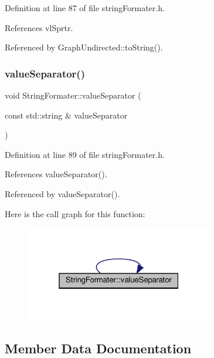 Definition at line 87 of file string\+Formater.\+h.



References vl\+Sprtr.



Referenced by Graph\+Undirected\+::to\+String().

\mbox{\label{classStringFormater_aa39006dd16b8c4f2ef55c6898b4561db}} 
\subsubsection{\texorpdfstring{value\+Separator()}{valueSeparator()}\hspace{0.1cm}{\footnotesize\ttfamily [2/2]}}
{\footnotesize\ttfamily void String\+Formater\+::value\+Separator (\begin{DoxyParamCaption}\item[{const std\+::string \&}]{value\+Separator }\end{DoxyParamCaption})\hspace{0.3cm}{\ttfamily [inline]}}



Definition at line 89 of file string\+Formater.\+h.



References value\+Separator().



Referenced by value\+Separator().

Here is the call graph for this function\+:
\nopagebreak
\begin{figure}[H]
\begin{center}
\leavevmode
\includegraphics[width=232pt]{classStringFormater_aa39006dd16b8c4f2ef55c6898b4561db_cgraph}
\end{center}
\end{figure}


\subsection{Member Data Documentation}
\mbox{\label{classStringFormater_a9b6627c0ee0fb27f698b2deff50a8497}} 
